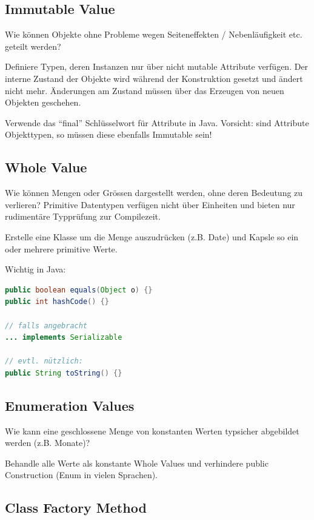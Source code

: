 \subsection{Immutable Value}

Wie können Objekte ohne Probleme wegen Seiteneffekten / Nebenläufigkeit etc. geteilt werden?

Definiere Typen, deren Instanzen nur über nicht mutable Attribute verfügen. Der interne Zustand der Objekte wird während der Konstruktion gesetzt und ändert nicht mehr. Änderungen am Zustand müssen über das Erzeugen von neuen Objekten geschehen.

Verwende das ``final'' Schlüsselwort für Attribute in Java. Vorsicht: sind Attribute Objekttypen, so müssen diese ebenfalls Immutable sein!

\subsection{Whole Value}

Wie können Mengen oder Grössen dargestellt werden, ohne deren Bedeutung zu verlieren? Primitive Datentypen verfügen nicht über Einheiten und bieten nur rudimentäre Typprüfung zur Compilezeit.

Erstelle eine Klasse um die Menge auszudrücken (z.B. Date) und Kapsle so ein oder mehrere primitive Werte.

Wichtig in Java:

\begin{lstlisting}[language=Java, caption={Wichtige oder nützliche zu implementierende Methoden für Values}]
public boolean equals(Object o) {}
public int hashCode() {}

// falls angebracht
... implements Serializable

// evtl. nützlich:
public String toString() {}
\end{lstlisting}

\subsection{Enumeration Values}

Wie kann eine geschlossene Menge von konstanten Werten typsicher abgebildet werden (z.B. Monate)?

Behandle alle Werte als konstante Whole Values und verhindere public Construction (Enum in vielen Sprachen).

\subsection{Class Factory Method}

